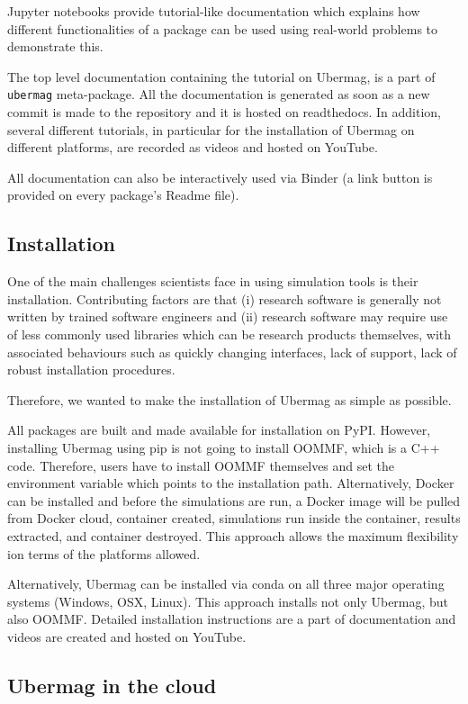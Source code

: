 \documentclass{deliverablereport}
\begin{document}
Jupyter notebooks provide tutorial-like documentation which explains
how different functionalities of a package can be used using
real-world problems to demonstrate this.

The top level documentation containing the tutorial on Ubermag, is a
part of \texttt{ubermag} meta-package. All the documentation is
generated as soon as a new commit is made to the repository and it is
hosted on readthedocs. In addition, several different tutorials, in
particular for the installation of Ubermag on different platforms, are
recorded as videos and hosted on YouTube.

All documentation can also be interactively used via Binder (a link
button is provided on every package's Readme file).

\subsection{Installation}

One of the main challenges scientists face in using simulation tools
is their installation. Contributing factors are that (i) research
software is generally not written by trained software engineers and
(ii) research software may require use of less commonly used libraries
which can be research products themselves, with associated behaviours
such as quickly changing interfaces, lack of support, lack of robust
installation procedures.

Therefore, we wanted to make the installation of Ubermag as simple as
possible.

All packages are built and made available for installation on
PyPI. However, installing Ubermag using pip is not going to install
OOMMF, which is a C++ code. Therefore, users have to install OOMMF
themselves and set the environment variable which points to the
installation path. Alternatively, Docker can be installed and before
the simulations are run, a Docker image will be pulled from Docker
cloud, container created, simulations run inside the container,
results extracted, and container destroyed. This approach allows the
maximum flexibility ion terms of the platforms allowed.

Alternatively, Ubermag can be installed via conda on all three major
operating systems (Windows, OSX, Linux). This approach installs not
only Ubermag, but also OOMMF. Detailed installation instructions are a
part of documentation and videos are created and hosted on YouTube.

\subsection{Ubermag in the cloud}
\end{document}
